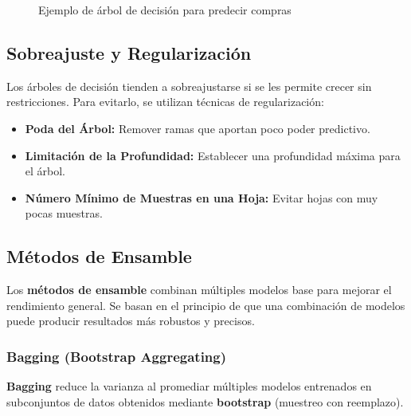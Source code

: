 \documentclass[a4paper, 11pt]{article}
\begin{document}
\begin{figure}[h!]
    \centering
    \caption{Ejemplo de árbol de decisión para predecir compras}
\end{figure}

\subsection{Sobreajuste y Regularización}

Los árboles de decisión tienden a sobreajustarse si se les permite crecer sin restricciones. Para evitarlo, se utilizan técnicas de regularización:

\begin{itemize}
    \item \textbf{Poda del Árbol:} Remover ramas que aportan poco poder predictivo.
    \item \textbf{Limitación de la Profundidad:} Establecer una profundidad máxima para el árbol.
    \item \textbf{Número Mínimo de Muestras en una Hoja:} Evitar hojas con muy pocas muestras.
\end{itemize}

\subsection{Métodos de Ensamble}

Los \textbf{métodos de ensamble} combinan múltiples modelos base para mejorar el rendimiento general. Se basan en el principio de que una combinación de modelos puede producir resultados más robustos y precisos.

\subsubsection{Bagging (Bootstrap Aggregating)}

\textbf{Bagging} reduce la varianza al promediar múltiples modelos entrenados en subconjuntos de datos obtenidos mediante \textbf{bootstrap} (muestreo con reemplazo).
\end{document}
